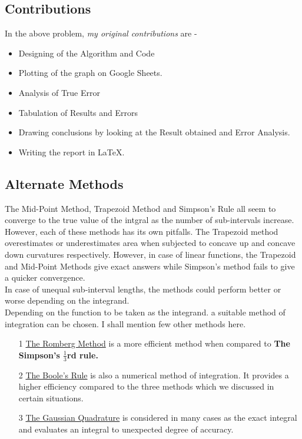 \documentclass[titlepage, 11pt]{article}
\begin{document}

\subsection{Contributions}
In the above problem, \textit{my original contributions} are - 
\begin{itemize}
    \item Designing of the Algorithm and Code
    \item Plotting of the graph on Google Sheets. 
    \item Analysis of True Error
    \item Tabulation of Results and Errors
    \item Drawing conclusions by looking at the Result obtained and Error Analysis.
    \item Writing the report in LaTeX. 
\end{itemize}



\subsection{Alternate Methods }
The Mid-Point Method, Trapezoid Method and Simpson's Rule all seem to converge to the true value of the intgral as the number of sub-intervals increase. However, each of these methods has its own pitfalls. The Trapezoid method overestimates or underestimates area when subjected to concave up and concave down curvatures respectively. However, in case of linear functions, the Trapezoid and Mid-Point Methods give exact answers while Simpson's method fails to give a quicker convergence. \\
In case of unequal sub-interval lengths, the methods could perform better or worse depending on the integrand. \\
Depending on the function to be taken as the integrand. a suitable method of integration can be chosen. I shall mention few other methods here. \\
\begin{itemize}
    \item [1] \href{https://en.wikipedia.org/wiki/Romberg%27s_method}{The Romberg Method} is a more efficient method when compared to \textbf{The Simpson's $\frac{1}{3}$rd rule.}
    \item [2] \href{https://en.wikipedia.org/wiki/Boole%27s_rule}{The Boole's Rule} is also a numerical method of integration. It provides a higher efficiency compared to the three methods which we discussed in certain situations. 
    \item [3] \href{https://en.wikipedia.org/wiki/Gaussian_quadrature}{The Gaussian Quadrature} is considered in many cases as the exact integral and evaluates an integral to unexpected degree of accuracy. 
\end{itemize}
\end{document}
